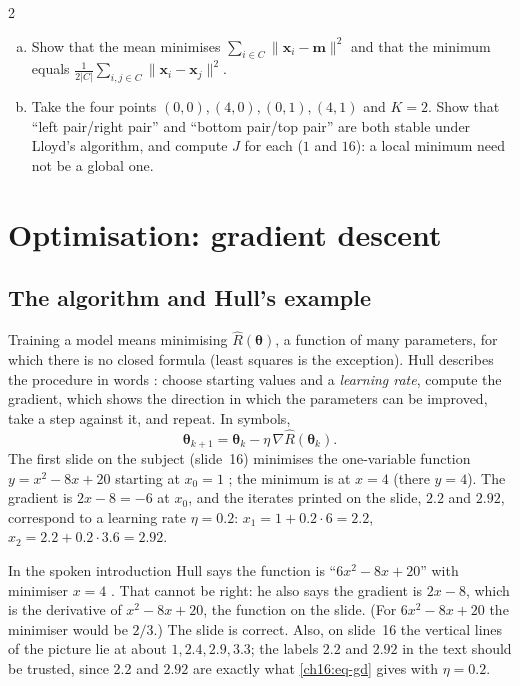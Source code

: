 \begin{paracol}{2}
\begin{exercise}
\leavevmode
\begin{enumerate}[(a)]
  \item Show that the mean minimises $\sum_{i\in C}\|\bm x_i-\bm m\|^2$ and that the minimum equals $\frac1{2|C|}\sum_{i,j\in C}\|\bm x_i-\bm x_j\|^2$.
  \item Take the four points $(0,0),(4,0),(0,1),(4,1)$ and $K=2$. Show that ``left pair/right pair'' and ``bottom pair/top pair'' are both stable
      under Lloyd's algorithm, and compute $J$ for each ($1$ and $16$): a local minimum need not be a global one.
\end{enumerate}
\end{exercise}

\section{Optimisation: gradient descent}\label{ch16:sec-gd}
\subsection{The algorithm and Hull's example}
Training a model means minimising $\hat R(\bm\theta)$, a function of many parameters, for which there is no closed formula
(least squares is the exception). Hull describes the procedure in words : choose starting values and a \emph{learning rate}, compute the gradient,
which shows the direction in which the parameters can be improved, take a step against it, and repeat. In symbols,
\begin{equation}\label{ch16:eq-gd}
  \bm\theta_{k+1}=\bm\theta_k-\eta\,\nabla\hat R(\bm\theta_k).
\end{equation}
The first slide on the subject (slide~16) minimises the one-variable function $y=x^2-8x+20$
starting at $x_0=1$ ; the minimum is at $x=4$ (there $y=4$). The gradient is $2x-8=-6$ at $x_0$, and the iterates printed on the slide, $2.2$ and $2.92$,
correspond to a learning rate $\eta=0.2$: $x_1=1+0.2\cdot6=2.2$, $x_2=2.2+0.2\cdot3.6=2.92$.

\begin{coursenote}
In the spoken introduction Hull says the function is ``$6x^2-8x+20$'' with minimiser $x=4$ . That cannot be right: he also says the gradient is
$2x-8$, which is the derivative of $x^2-8x+20$, the function on the slide. (For $6x^2-8x+20$ the minimiser would be $2/3$.) The
slide is correct. Also, on slide~16 the vertical lines of the picture lie at about $1, 2.4, 2.9, 3.3$; the labels $2.2$ and $2.92$ in the
text should be trusted, since $2.2$ and $2.92$ are exactly what \eqref{ch16:eq-gd} gives with $\eta=0.2$.
\end{coursenote}


\end{paracol}
